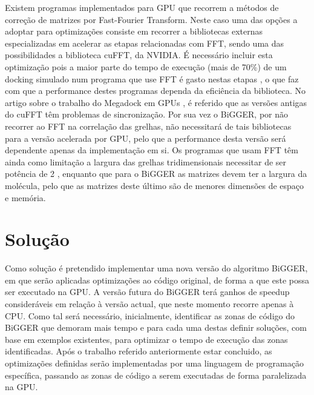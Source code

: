  Existem programas implementados para GPU que recorrem a métodos de correção de matrizes por Fast-Fourier Transform. Neste caso uma das opções a adoptar para optimizações consiste em recorrer a bibliotecas externas especializadas em acelerar as etapas relacionadas com FFT, sendo uma das possibilidades a biblioteca cuFFT, da NVIDIA. É necessário incluir esta optimização pois a maior parte do tempo de execução (mais de 70\%) de um docking simulado num programa que use FFT é gasto nestas etapas \cite{piper2014gpu} \cite{shimoda2015protein}, o que faz com que a performance destes programas dependa da eficiência da biblioteca. No artigo sobre o trabalho do Megadock em GPUs \cite{shimoda2015protein}, é referido que as versões antigas do cuFFT têm problemas de sincronização. Por sua vez o BiGGER, por não recorrer ao FFT na correlação das grelhas, não necessitará de tais bibliotecas para a versão acelerada por GPU, pelo que a performance desta versão será dependente apenas da implementação em si. Os programas que usam FFT têm ainda como limitação a largura das grelhas tridimensionais necessitar de ser potência de 2 \cite{biggerPaper}, enquanto que para o BiGGER as matrizes devem ter a largura da molécula, pelo que as matrizes deste último são de menores dimensões de espaço e memória.
%


\section{Solução}
%
%
%
Como solução é pretendido implementar uma nova versão do algoritmo BiGGER, em que serão aplicadas optimizações ao código original, de forma a que este possa ser executado na GPU. A versão futura do BiGGER terá ganhos de speedup consideráveis em relação à versão actual, que neste momento recorre apenas à CPU. Como tal será necessário, inicialmente, identificar as zonas de código do BiGGER que demoram mais tempo e para cada uma destas definir soluções, com base em exemplos existentes, para optimizar o tempo de execução das zonas identificadas. Após o trabalho referido anteriormente estar concluido, as optimizações definidas serão implementadas por uma linguagem de programação específica, passando as zonas de código a serem executadas de forma paralelizada na GPU.

